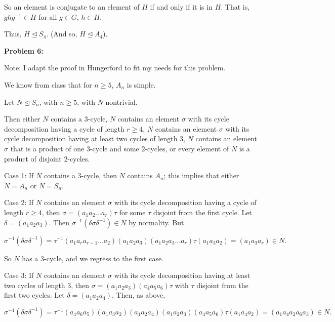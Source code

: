 \documentclass[a4paper,12pt]{article}
\newcommand{\tab}{\hspace{4mm}} %
\newcommand{\shunt}{\vspace{20mm}}
\newcommand{\de}{\delta}
\newcommand{\subgp}{\mathrel{\unlhd}}
\begin{document}
\tab So an element is conjugate to an element of $H$ if and only if it is in $H$. That is, $ghg^{-1} \in H$ for all $g \in G$, $h \in H$.

Thus, $H \subgp S_4$. (And so, $H \subgp A_4$).

\shunt

{\bf Problem 6:}

Note: I adapt the proof in Hungerford to fit my needs for this problem.

We know from class that for $n \geq 5$, $A_n$ is simple.

Let $N \subgp S_n$, with $n \geq 5$, with $N$ nontrivial.

Then either $N$ contains a $3$-cycle, $N$ contains an element $\sigma$ with its cycle decomposition having a cycle of length $r \geq 4$, $N$ contains an element $\sigma$ with its cycle decomposition having at least two cycles of length $3$, $N$ contains an element $\sigma$ that is a product of one $3$-cycle and some $2$-cycles, or every element of $N$ is a product of disjoint $2$-cycles.

\tab Case 1: If $N$ contains a $3$-cycle, then $N$ contains $A_n$; this implies that either $N=A_n$ or $N = S_n$.

\tab Case 2: If $N$ contains an element $\sigma$ with its cycle decomposition having a cycle of length $r \geq 4$, then $\sigma = (a_1a_2\ldots a_r)\tau$ for some $\tau$ disjoint from the first cycle. Let $\de = (a_1a_2a_3)$. Then $\sigma^{-1}(\de \sigma \de^{-1}) \in N$ by normality. But

\begin{displaymath}
\sigma^{-1}(\de \sigma \de^{-1}) = \tau^{-1}(a_1a_ra_{r-1} \ldots a_2)(a_1a_2a_3)(a_1a_2a_3 \ldots a_r)\tau (a_1a_3a_2) = (a_1a_3a_r) \in N.
\end{displaymath}


\tab So $N$ has a $3$-cycle, and we regress to the first case.

\tab Case 3: If $N$ contains an element $\sigma$ with its cycle decomposition having at least two cycles of length $3$, then $\sigma = (a_1a_2a_3)(a_4a_5a_6)\tau$ with $\tau$ disjoint from the first two cycles. Let $\de = (a_1a_2a_4)$. Then, as above, 

\begin{displaymath}
\sigma^{-1}(\de \sigma \de^{-1}) = \tau^{-1}(a_4a_6a_5)(a_1a_3a_2)(a_1a_2a_4)(a_1a_2a_3)(a_4a_5a_6)\tau (a_1a_4a_2) = (a_1a_4a_2a_6a_3) \in N.
\end{displaymath}
\end{document}
